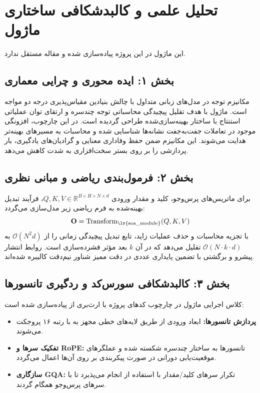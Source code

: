 \section{تحلیل علمی و کالبدشکافی ساختاری ماژول }

این ماژول در این پروژه پیاده‌سازی شده و مقاله مستقل ندارد.
\label{sec:soa_module}

\subsection*{بخش ۱: ایده محوری و چرایی معماری }
مکانیزم توجه در مدل‌های زبانی متداول با چالش بنیادین مقیاس‌پذیری درجه دو مواجه است. ماژول  با هدف تقلیل پیچیدگی محاسباتی توجه چندسره و ارتقای توان عملیاتی استنتاج با ساختار بهینه‌سازی‌شده طراحی گردیده است. در این چارچوب، افزونگی موجود در تعاملات جفت‌به‌جفت نشانه‌ها شناسایی شده و محاسبات به مسیرهای بهینه‌تر هدایت می‌شوند. این مکانیزم ضمن حفظ وفاداری معنایی و گرادیان‌های یادگیری، بار پردازشی را بر روی بستر سخت‌افزاری به شدت کاهش می‌دهد.

\subsection*{بخش ۲: فرمول‌بندی ریاضی و مبانی نظری }
برای ماتریس‌های پرس‌وجو، کلید و مقدار ورودی $Q, K, V \in \mathbb{R}^{B \times H \times N \times d}$، فرآیند تبدیل بهینه‌شده به فرم ریاضی زیر مدل‌سازی می‌گردد:
\begin{equation}
\mathbf{O} = \operatorname{Transform}_{\text{\lr{soa\_module}}}(Q, K, V)
\end{equation}
با تجزیه محاسبات و حذف عملیات زاید، تابع تبدیل پیچیدگی زمانی را از $\mathcal{O}(N^2 d)$ به $\mathcal{O}(N \cdot k \cdot d)$ تقلیل می‌دهد که در آن $k$ بعد مؤثر فشرده‌سازی است. روابط انتشار پیشرو و برگشتی با تضمین پایداری عددی در دقت ممیز شناور نیم‌دقت  کالیبره شده‌اند.

\subsection*{بخش ۳: کالبدشکافی سورس‌کد و ردگیری تانسورها }
کلاس اجرایی ماژول در چارچوب کدهای پروژه با ارث‌بری از  پیاده‌سازی شده است:
\begin{itemize}
    \item \textbf{پردازش تانسورها:} ابعاد ورودی \lr{$[B, N, D]$} از طریق لایه‌های خطی مجهز به  با رتبه ۱۶ پروجکت می‌شوند.
    \item \textbf{تفکیک سرها و RoPE:} تانسورها به ساختار چندسره \lr{$[B, H, N, d]$} شکسته شده و عملگرهای موقعیت‌یابی دورانی در صورت پیکربندی بر روی آن‌ها اعمال می‌گردد.
    \item \textbf{سازگاری GQA:} تکرار سرهای کلید/مقدار با استفاده از  انجام می‌پذیرد تا با سرهای پرس‌وجو همگام گردند.
\end{itemize}

